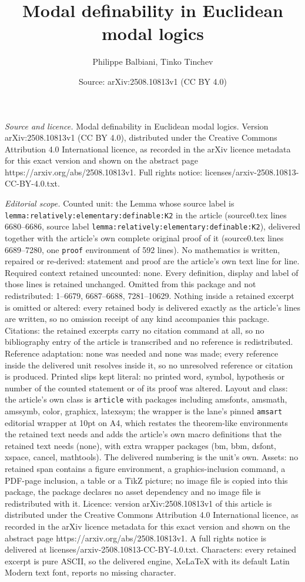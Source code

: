 \documentclass[10pt,a4paper]{amsart}
\title[Modal definability in Euclidean modal logics]{Modal definability in Euclidean modal logics}
\author{Philippe Balbiani, Tinko Tinchev}
\date{Source: arXiv:2508.10813v1 (CC BY 4.0)}
\begin{document}
\maketitle

\noindent\emph{Source and licence.} Modal definability in Euclidean modal logics. Version arXiv:2508.10813v1 (CC BY 4.0), distributed under the Creative Commons Attribution 4.0 International licence, as recorded in the arXiv licence metadata for this exact version and shown on the abstract page https://arxiv.org/abs/2508.10813v1. Full rights notice: licenses/arxiv-2508.10813-CC-BY-4.0.txt.\par\smallskip

\noindent\textit{Editorial scope.} Counted unit: the Lemma whose source label is \texttt{lemma:relatively:elementary:definable:K2} in the article (source0.tex lines 6680--6686, source label \texttt{lemma:relatively:elementary:definable:K2}), delivered together with the article's own complete original proof of it (source0.tex lines 6689--7280, one \texttt{proof} environment of 592 lines). No mathematics is written, repaired or re-derived: statement and proof are the article's own text line for line. Required context retained uncounted: none. Every definition, display and label of those lines is retained unchanged. Omitted from this package and not redistributed: 1--6679, 6687--6688, 7281--10629. Nothing inside a retained excerpt is omitted or altered: every retained body is delivered exactly as the article's lines are written, so no omission receipt of any kind accompanies this package. Citations: the retained excerpts carry no citation command at all, so no bibliography entry of the article is transcribed and no reference is redistributed. Reference adaptation: none was needed and none was made; every reference inside the delivered unit resolves inside it, so no unresolved reference or citation is produced. Printed slips kept literal: no printed word, symbol, hypothesis or number of the counted statement or of its proof was altered. Layout and class: the article's own class is \texttt{article} with packages including amsfonts, amsmath, amssymb, color, graphicx, latexsym; the wrapper is the lane's pinned \texttt{amsart} editorial wrapper at 10pt on A4, which restates the theorem-like environments the retained text needs and adds the article's own macro definitions that the retained text needs (none), with extra wrapper packages (bm, bbm, dsfont, xspace, cancel, mathtools). The delivered numbering is the unit's own. Assets: no retained span contains a figure environment, a graphics-inclusion command, a PDF-page inclusion, a table or a TikZ picture; no image file is copied into this package, the package declares no asset dependency and no image file is redistributed with it. Licence: version arXiv:2508.10813v1 of this article is distributed under the Creative Commons Attribution 4.0 International licence, as recorded in the arXiv licence metadata for this exact version and shown on the abstract page https://arxiv.org/abs/2508.10813v1. A full rights notice is delivered at licenses/arxiv-2508.10813-CC-BY-4.0.txt. Characters: every retained excerpt is pure ASCII, so the delivered engine, XeLaTeX with its default Latin Modern text font, reports no missing character.
\end{document}
